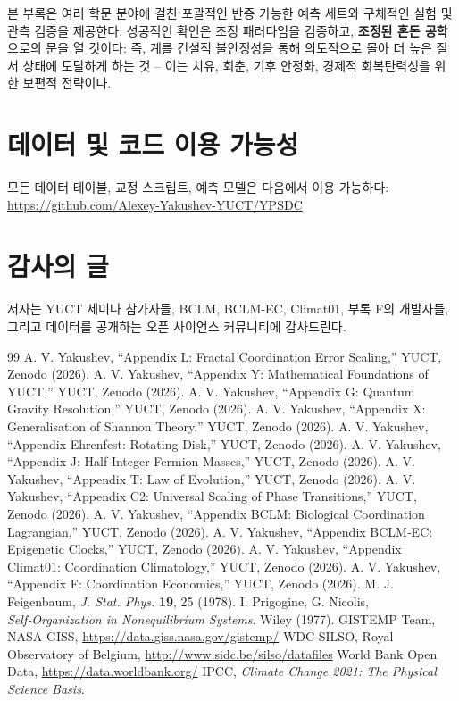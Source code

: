 \documentclass[12pt,a4paper]{article}
\begin{document}
	본 부록은 여러 학문 분야에 걸친 포괄적인 반증 가능한 예측 세트와 구체적인 실험 및 관측 검증을 제공한다.
	성공적인 확인은 조정 패러다임을 검증하고, \textbf{조정된 혼돈 공학}으로의 문을 열 것이다: 즉, 계를 건설적 불안정성을 통해 의도적으로 몰아 더 높은 질서 상태에 도달하게 하는 것 – 이는 치유, 회춘, 기후 안정화, 경제적 회복탄력성을 위한 보편적 전략이다.
	
	\section*{데이터 및 코드 이용 가능성}
	
	모든 데이터 테이블, 교정 스크립트, 예측 모델은 다음에서 이용 가능하다:
	\url{https://github.com/Alexey-Yakushev-YUCT/YPSDC}
	
	\section*{감사의 글}
	
	저자는 YUCT 세미나 참가자들, BCLM, BCLM‑EC, Climat01, 부록 F의 개발자들, 그리고 데이터를 공개하는 오픈 사이언스 커뮤니티에 감사드린다.
	
	\begin{thebibliography}{99}
		 A. V. Yakushev, ``Appendix L: Fractal Coordination Error Scaling,'' YUCT, Zenodo (2026).
		 A. V. Yakushev, ``Appendix Y: Mathematical Foundations of YUCT,'' YUCT, Zenodo (2026).
		 A. V. Yakushev, ``Appendix G: Quantum Gravity Resolution,'' YUCT, Zenodo (2026).
		 A. V. Yakushev, ``Appendix X: Generalisation of Shannon Theory,'' YUCT, Zenodo (2026).
		 A. V. Yakushev, ``Appendix Ehrenfest: Rotating Disk,'' YUCT, Zenodo (2026).
		 A. V. Yakushev, ``Appendix J: Half‑Integer Fermion Masses,'' YUCT, Zenodo (2026).
		 A. V. Yakushev, ``Appendix T: Law of Evolution,'' YUCT, Zenodo (2026).
		 A. V. Yakushev, ``Appendix C2: Universal Scaling of Phase Transitions,'' YUCT, Zenodo (2026).
		 A. V. Yakushev, ``Appendix BCLM: Biological Coordination Lagrangian,'' YUCT, Zenodo (2026).
		 A. V. Yakushev, ``Appendix BCLM‑EC: Epigenetic Clocks,'' YUCT, Zenodo (2026).
		 A. V. Yakushev, ``Appendix Climat01: Coordination Climatology,'' YUCT, Zenodo (2026).
		 A. V. Yakushev, ``Appendix F: Coordination Economics,'' YUCT, Zenodo (2026).
		 M. J. Feigenbaum, \emph{J. Stat. Phys.} \textbf{19}, 25 (1978).
		 I. Prigogine, G. Nicolis, \emph{Self‑Organization in Nonequilibrium Systems}. Wiley (1977).
		 GISTEMP Team, NASA GISS, \url{https://data.giss.nasa.gov/gistemp/}
		 WDC‑SILSO, Royal Observatory of Belgium, \url{http://www.sidc.be/silso/datafiles}
		 World Bank Open Data, \url{https://data.worldbank.org/}
		 IPCC, \emph{Climate Change 2021: The Physical Science Basis}.
	\end{thebibliography}
	
\end{document}
